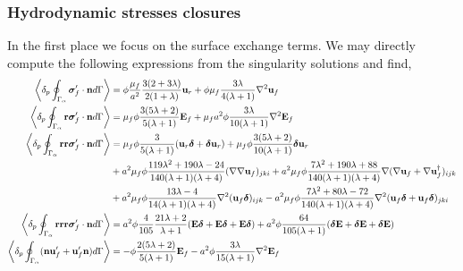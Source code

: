 \subsubsection{Hydrodynamic stresses closures}
In the first place we focus on the surface exchange terms. 
We may directly compute the following expressions from the singularity solutions and find, 
\begin{align}
    \pSavg{\bm\sigma_f'\cdot \textbf{n}} &
    =
    \phi
    \frac{\mu_f}{a^2}
    \frac{3(2+3\lambda)}{2(1+\lambda)}\textbf{u}_r
    + \phi\mu_f  \frac{3\lambda}{4(\lambda +1)} \grad^2 \textbf{u}_f
    \label{eq:drag_forces}
    \\
    \pSavg{\textbf{r}\bm\sigma_f'\cdot \textbf{n}} &
    = \mu_f \phi 
    \frac{3(5\lambda +2)}{5(\lambda +1)}\textbf{E}_f
    + \mu_f a^2 \phi \frac{3\lambda}{10(\lambda+1)}\grad^2  \textbf{E}_f
    \\
    \pSavg{\textbf{rr}\bm\sigma_f'\cdot \textbf{n}} &
    =
    \mu_f \phi \frac{3}{5(\lambda +1)} (\textbf{u}_r \bm\delta + \bm\delta \textbf{u}_r)
    + \mu_f \phi \frac{3(5\lambda +2)}{10(\lambda+1)}\bm\delta \textbf{u}_r\\
    &+ a^2 \mu_f \phi \frac{119\lambda^2+190\lambda-24}{140(\lambda+1)(\lambda+4)}(\grad\grad \textbf{u}_f)_{jki}
    + a^2\mu_f \phi \frac{7\lambda^2+190\lambda+88}{140(\lambda+1)(\lambda+4)}\grad(\grad \textbf{u}_f+\grad \textbf{u}_f^\dagger )_{ijk}\nonumber\\
    &+a^2\mu_f \phi \frac{13\lambda - 4 }{14(\lambda+1)(\lambda+4)}\grad^2 ( \textbf{u}_f\bm\delta)_{ijk}
    - a^2\mu_f \phi \frac{7\lambda^2 + 80 \lambda - 72}{140(\lambda+1)(\lambda+4)}\grad^2(\textbf{u}_f\bm\delta  + \textbf{u}_f \bm\delta)_{jki}\nonumber \\
    \pSavg{\textbf{rrr}\bm\sigma_f'\cdot \textbf{n}} &
    =
    a^2\phi\frac{4}{105}\frac{21\lambda+2}{\lambda+1}
    (\textbf{E}\bm\delta+\textbf{E}\bm\delta + \textbf{E}\bm\delta)
    + 
    a^2\phi \frac{64}{105(\lambda+1)}
    (\bm\delta\textbf{E}+\bm\delta\textbf{E} + \bm\delta\textbf{E})
\\
    \pSavg{ (\textbf{n} \textbf{u}_f' + \textbf{u}_f' \textbf{n})}
    &=
    -  \phi \frac{2(5\lambda +2)}{5(\lambda+1)}\textbf{E}_f
    -  a^2 \phi \frac{3\lambda}{15(\lambda+1)}\grad^2  \textbf{E}_f

\end{align}
